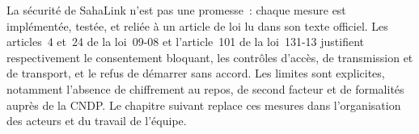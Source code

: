 \conclchap

La sécurité de SahaLink n'est pas une promesse~: chaque mesure est implémentée, testée, et reliée à un article de loi lu dans son texte officiel. Les articles~4 et~24 de la loi~09-08 et l'article~101 de la loi~131-13 justifient respectivement le consentement bloquant, les contrôles d'accès, de transmission et de transport, et le refus de démarrer sans accord. Les limites sont explicites, notamment l'absence de chiffrement au repos, de second facteur et de formalités auprès de la \ac{CNDP}. Le chapitre suivant replace ces mesures dans l'organisation des acteurs et du travail de l'équipe.
